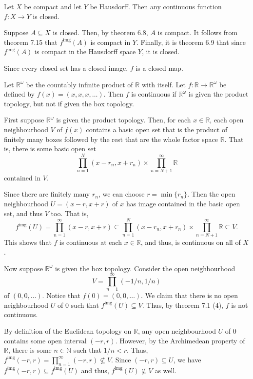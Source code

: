 \documentclass[12 pt, letterpaper]{hmcpset}
\begin{document}
\pagebreak

\begin{problem}[7.24]
	Let $X$ be compact and let $Y$ be Hausdorff. Then any continuous function $f : X \to Y$ is closed.
\end{problem}

\begin{solution}
	Suppose $A \subseteq X$ is closed. Then, by theorem 6.8, $A$ is compact. It follows from theorem 7.15 that $f^{\text{img}}(A)$ is compact in $Y$. Finally, it is theorem 6.9 that since $f^{\text{img}}(A)$ is compact in the Hausdorff space $Y$, it is closed.

	Since every closed set has a closed image, $f$ is a closed map.
\end{solution}

\pagebreak

\begin{problem}[7.41]
	Let $\mathbb{R}^{\omega}$ be the countably infinite product of $\mathbb{R}$ with itself. Let $f : \mathbb{R} \to \mathbb{R}^{\omega}$ be defined by $f(x) = (x, x, x, \dots)$. Then $f$ is continuous if $\mathbb{R}^{\omega}$ is given the product topology, but not if given the box topology.
\end{problem}

\begin{solution}
	First suppose $\mathbb{R}^{\omega}$ is given the product topology. Then, for each $x \in \mathbb{R}$, each open neighbourhood $V$ of $f(x)$ contains a basic open set that is the product of finitely many boxes followed by the rest that are the whole factor space $\mathbb{R}$. That is, there is some basic open set
	\[
		\prod_{n = 1}^{N} (x - r_{n}, x + r_{n}) \times \prod_{n = N + 1}^{\infty} \mathbb{R}
	\]
	contained in $V$.

	Since there are finitely many $r_{n}$, we can choose $r = \min \{ r_{n} \}$. Then the open neighbourhood $U = (x - r, x + r)$ of $x$ has image contained in the basic open set, and thus $V$ too. That is,
	\[
		f^{\text{img}}(U) = \prod_{n = 1}^{\infty} (x - r, x + r) \subseteq \prod_{n = 1}^{N} (x - r_{n}, x + r_{n}) \times \prod_{n = N + 1}^{\infty} \mathbb{R} \subseteq V.
	\]
	This shows that $f$ is continuous at each $x \in \mathbb{R}$, and thus, is continuous on all of  $X$.

	Now suppose $\mathbb{R}^{\omega}$ is given the box topology. Consider the open neighbourhood
	\[
		V = \prod_{n = 1}^{\infty} (-1/n, 1/n)
	\]
	of $(0, 0, \dots)$. Notice that $f(0) = (0, 0, \dots)$. We claim that there is no open neighbourhood $U$ of $0$ such that $f^{\text{img}}(U) \subseteq V$. Thus, by theorem 7.1 (4), $f$ is not continuous.

	By definition of the Euclidean topology on $\mathbb{R}$, any open neighbourhood $U$ of $0$ contains some open interval $(-r, r)$. However, by the Archimedean property of $\mathbb{R}$, there is some $n \in \mathbb{N}$ such that $1/n < r$. Thus, $f^{\text{img}}(-r, r) = \prod_{n = 1}^{\infty} (-r, r) \not\subseteq V$. Since $(-r, r) \subseteq U$, we have  $f^{\text{img}}(-r, r) \subseteq f^{\text{img}}(U)$ and thus, $f^{\text{img}}(U) \not\subseteq V$ as well.
\end{solution}
\end{document}
